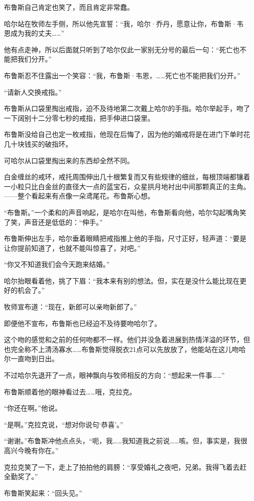 \documentclass[../main]{subfiles}
\begin{document}
布鲁斯自己肯定也笑了，而且肯定非常蠢。

哈尔站在牧师左手侧，所以他先宣誓：“我，哈尔·乔丹，愿意让你，布鲁斯·韦恩成为我的丈夫……”

他有点走神，所以后面就只听到了哈尔仅此一家别无分号的最后一句：“死亡也不能把我们分开。”

布鲁斯忍不住露出一个笑容：“我，布鲁斯·韦恩，……死亡也不能把我们分开。”

“请新人交换戒指。”

布鲁斯从口袋里掏出戒指，迫不及待地第二次戴上哈尔的手指。哈尔举起手，吻了一下阔别十二分零七秒的戒指，把手伸进口袋里。

布鲁斯没给自己也定一枚戒指，他现在后悔了，因为他的婚戒将是在进门下单时花几十块钱买的破指环。

可哈尔从口袋里掏出来的东西却全然不同。

白金缠丝的戒环，戒托周围伸出几十根繁复而又有些规律的细丝，每根顶端都镶着一小粒只比白金丝的直径大一点的蓝宝石，众星拱月地衬出中间那颗真正的主角。——整个看起来有点像一朵鸢尾花。布鲁斯心想。

“布鲁斯。”一个柔和的声音响起，是哈尔在叫他，布鲁斯看向他，哈尔勾起嘴角笑了笑，声音还是低低的：“伸手。”

布鲁斯伸出左手，哈尔垂着眼睛把戒指推上他的手指，尺寸正好，轻声道：“要是让你提前知道了，也就不能叫惊喜了，对吧。”

“你又不知道我们会今天跑来结婚。”

哈尔抬眼看着他，挑了下眉：“我本来有别的想法。但，实在是没什么能比现在更好的机会了。”

牧师宣布道：“现在，新郎可以亲吻新郎了。”

即便他不宣布，布鲁斯也已经迫不及待要吻哈尔了。

这个吻的感觉和之前的任何吻都不一样。他们并没急着进展到热情洋溢的环节，但也完全称不上清汤寡水……布鲁斯觉得脱衣21点可以先放放了，他能站在这儿吻哈尔一直吻到日出。

不过哈尔先退开了一点，眼神飘向与牧师相反的方向：“想起来一件事……”

布鲁斯顺着他的眼神看过去……哦，克拉克。

“你还在啊。”他说。

“是啊。”克拉克说，“想对你说句‘恭喜’。”

“谢谢。”布鲁斯冲他点点头，“呃，我……我知道我之前说……咳。但，事实是，我很高兴今晚有你在。”

克拉克笑了一下，走上了拍拍他的肩膀：“享受婚礼之夜吧，兄弟。我得飞着去赶全勤奖了。”

布鲁斯笑起来：“回头见。”
\end{document}
